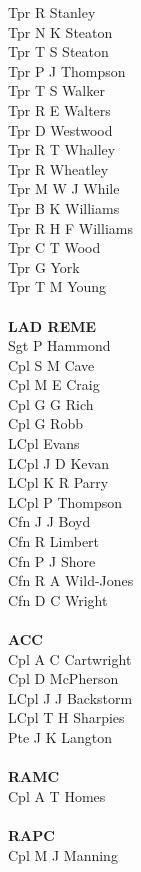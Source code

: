 \begin{multicols}{3}
  Tpr R Stanley \\
  Tpr N K Steaton \\
  Tpr T S Steaton \\
  Tpr P J Thompson \\
  Tpr T S Walker \\
  Tpr R E Walters \\
  Tpr D Westwood \\
  Tpr R T Whalley \\
  Tpr R Wheatley \\
  Tpr M W J While \\
  Tpr B K Williams \\
  Tpr R H F Williams \\
  Tpr C T Wood \\
  Tpr G York \\
  Tpr T M Young \\
  \\
  \textbf{LAD REME} \\
  Sgt P Hammond \\
  Cpl S M Cave \\
  Cpl M E Craig \\
  Cpl G G Rich \\
  Cpl G Robb \\
  LCpl Evans \\
  LCpl J D Kevan \\
  LCpl K R Parry \\
  LCpl P Thompson \\
  Cfn J J Boyd \\
  Cfn R Limbert \\
  Cfn P J Shore \\
  Cfn R A Wild-Jones \\
  Cfn D C Wright \\
  \\
  \textbf{ACC} \\
  Cpl A C Cartwright \\
  Cpl D McPherson \\
  LCpl J J Backstorm \\
  LCpl T H Sharpies \\
  Pte J K Langton \\
  \\
  \textbf{RAMC} \\
  Cpl A T Homes \\
  \\
  \textbf{RAPC} \\
  Cpl M J Manning \\
  \\

\end{multicols}
